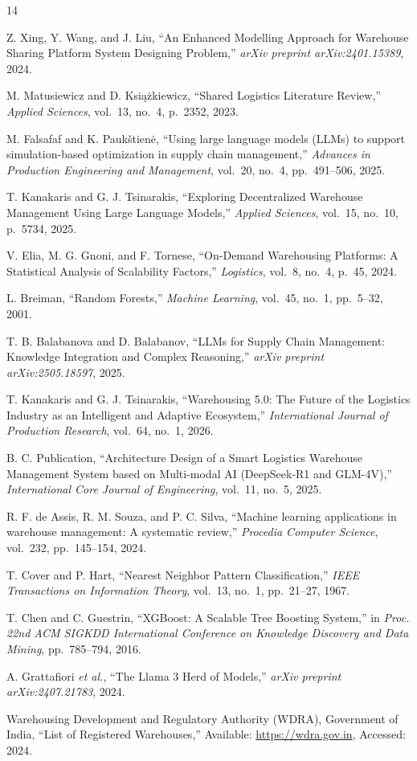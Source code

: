 \documentclass[pdflatex,sn-mathphys-num]{sn-jnl}
\theoremstyle{thmstyleone}
\theoremstyle{thmstyletwo}
\theoremstyle{thmstylethree}
\begin{document}
\begin{thebibliography}{14}

Z. Xing, Y. Wang, and J. Liu, ``An Enhanced Modelling Approach for Warehouse Sharing Platform System Designing Problem,'' \textit{arXiv preprint arXiv:2401.15389}, 2024.

M. Matusiewicz and D. Ksi\k{a}\.zkiewicz, ``Shared Logistics Literature Review,'' \textit{Applied Sciences}, vol.~13, no.~4, p.~2352, 2023.

M. Falsafaf and K. Pauk\v{s}tien\.{e}, ``Using large language models (LLMs) to support simulation-based optimization in supply chain management,'' \textit{Advances in Production Engineering and Management}, vol.~20, no.~4, pp.~491--506, 2025.

T. Kanakaris and G. J. Tsinarakis, ``Exploring Decentralized Warehouse Management Using Large Language Models,'' \textit{Applied Sciences}, vol.~15, no.~10, p.~5734, 2025.

V. Elia, M. G. Gnoni, and F. Tornese, ``On-Demand Warehousing Platforms: A Statistical Analysis of Scalability Factors,'' \textit{Logistics}, vol.~8, no.~4, p.~45, 2024.

L. Breiman, ``Random Forests,'' \textit{Machine Learning}, vol.~45, no.~1, pp.~5--32, 2001.

T. B. Balabanova and D. Balabanov, ``LLMs for Supply Chain Management: Knowledge Integration and Complex Reasoning,'' \textit{arXiv preprint arXiv:2505.18597}, 2025.

T. Kanakaris and G. J. Tsinarakis, ``Warehousing 5.0: The Future of the Logistics Industry as an Intelligent and Adaptive Ecosystem,'' \textit{International Journal of Production Research}, vol.~64, no.~1, 2026.

B. C. Publication, ``Architecture Design of a Smart Logistics Warehouse Management System based on Multi-modal AI (DeepSeek-R1 and GLM-4V),'' \textit{International Core Journal of Engineering}, vol.~11, no.~5, 2025.

R. F. de Assis, R. M. Souza, and P. C. Silva, ``Machine learning applications in warehouse management: A systematic review,'' \textit{Procedia Computer Science}, vol.~232, pp.~145--154, 2024.

T. Cover and P. Hart, ``Nearest Neighbor Pattern Classification,'' \textit{IEEE Transactions on Information Theory}, vol.~13, no.~1, pp.~21--27, 1967.

T. Chen and C. Guestrin, ``XGBoost: A Scalable Tree Boosting System,'' in \textit{Proc. 22nd ACM SIGKDD International Conference on Knowledge Discovery and Data Mining}, pp.~785--794, 2016.

A. Grattafiori \textit{et al.}, ``The Llama 3 Herd of Models,'' \textit{arXiv preprint arXiv:2407.21783}, 2024.

Warehousing Development and Regulatory Authority (WDRA), Government of India, ``List of Registered Warehouses,'' Available: \url{https://wdra.gov.in}, Accessed: 2024.

\end{thebibliography}
\end{document}
